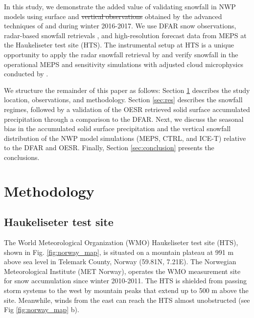 \documentclass{ametsocV5}
\providecommand{\DIFadd}[1]{{\protect\color{blue}\uwave{#1}}} %
\providecommand{\DIFdel}[1]{{\protect\color{red}\sout{#1}}}                      %
\providecommand{\DIFaddbegin}{} %
\providecommand{\DIFaddend}{} %
\providecommand{\DIFdelbegin}{} %
\providecommand{\DIFdelend}{} %
\newcommand{\DIFscaledelfig}{0.5}
\newlength{\DIFdelgraphicswidth} %
\newlength{\DIFdelgraphicsheight} %
\newcommand{\DIFaddincludegraphics}[2][]{{\color{blue}\fbox{\DIFOincludegraphics[#1]{#2}}}} %
\newcommand{\DIFdelincludegraphics}[2][]{%
\sbox{\DIFdelgraphicsbox}{\DIFOincludegraphics[#1]{#2}}%
\settoboxwidth{\DIFdelgraphicswidth}{\DIFdelgraphicsbox} %
\settoboxtotalheight{\DIFdelgraphicsheight}{\DIFdelgraphicsbox} %
\scalebox{\DIFscaledelfig}{%
\parbox[b]{\DIFdelgraphicswidth}{\usebox{\DIFdelgraphicsbox}\\[-\baselineskip] \rule{\DIFdelgraphicswidth}{0em}}\llap{\resizebox{\DIFdelgraphicswidth}{\DIFdelgraphicsheight}{%
\setlength{\unitlength}{\DIFdelgraphicswidth}%
\begin{picture}(1,1)%
\thicklines\linethickness{2pt} %
{\color[rgb]{1,0,0}\put(0,0){\framebox(1,1){}}}%
{\color[rgb]{1,0,0}\put(0,0){\line( 1,1){1}}}%
{\color[rgb]{1,0,0}\put(0,1){\line(1,-1){1}}}%
\end{picture}%
}\hspace*{3pt}}} %
} %
\DeclareRobustCommand{\DIFaddbegin}{\DIFOaddbegin \let\includegraphics\DIFaddincludegraphics} %
\DeclareRobustCommand{\DIFaddend}{\DIFOaddend \let\includegraphics\DIFOincludegraphics} %
\DeclareRobustCommand{\DIFdelbegin}{\DIFOdelbegin \let\includegraphics\DIFdelincludegraphics} %
\DeclareRobustCommand{\DIFdelend}{\DIFOaddend \let\includegraphics\DIFOincludegraphics} %
\begin{document}
    
    In this study, we demonstrate the added value of validating snowfall in NWP models using surface and \DIFdelbegin \DIFdel{vertical observations }\DIFdelend \DIFaddbegin \DIFadd{OESR vertical profiles }\DIFaddend obtained by the advanced techniques of \citet{cooper_variational_2017} and \citet{schirle_estimation_2019} during winter 2016-2017. We use DFAR snow observations, radar-based snowfall retrievals \citep{cooper_variational_2017,schirle_estimation_2019}, and high-resolution forecast data from MEPS at the Haukeliseter test site (HTS). The instrumental setup at HTS is a unique opportunity to apply the radar snowfall retrieval by \citet{schirle_estimation_2019} and verify snowfall in the operational MEPS and sensitivity simulations with adjusted cloud microphysics conducted by \citet{engdahl_effects_2020}.

    We structure the remainder of this paper as follows: Section \ref{sec:methodology} describes the study location, observations, and methodology. Section \ref{sec:res} describes the snowfall regimes, followed by a validation of the OESR retrieved solid surface accumulated precipitation through a comparison to the DFAR. Next, we discuss the seasonal bias in the accumulated solid surface precipitation and the vertical snowfall distribution of the NWP model simulations (MEPS, CTRL, and ICE-T) relative to the DFAR and OESR. Finally, Section \ref{sec:conclusion} presents the conclusions.


\section{Methodology}\label{sec:methodology}
	\subsection{Haukeliseter test site}
		The World Meteorological Organization (WMO) Haukeliseter test site (HTS), shown in Fig. \ref{fig:norway_map}, is situated on a mountain plateau at 991 m above sea level in Telemark County, Norway (59.81\textdegree N, 7.21\textdegree E). The Norwegian Meteorological Institute (MET Norway), operates the WMO measurement site for snow accumulation since winter 2010-2011. The HTS is shielded from passing storm systems to the west by mountain peaks that extend up to 500 m above the site. Meanwhile, winds from the east can reach the HTS almost unobstructed (see Fig \ref{fig:norway_map} b).  
\end{document}
